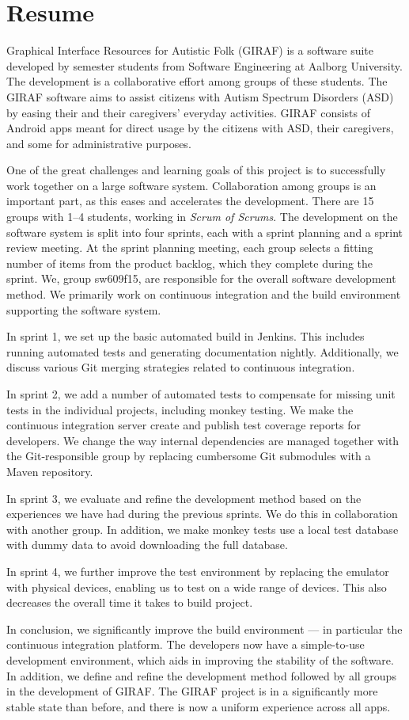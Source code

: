 \chapter*{Resume}
Graphical Interface Resources for Autistic Folk (GIRAF) is a software suite developed by  semester students from Software Engineering at Aalborg University. The development is a collaborative effort among groups of these students. The GIRAF software aims to assist citizens with Autism Spectrum Disorders (ASD) by easing their and their caregivers' everyday activities. GIRAF consists of Android apps meant for direct usage by the citizens with ASD, their caregivers, and some for administrative purposes.

One of the great challenges and learning goals of this project is to successfully work together on a large software system. Collaboration among groups is an important part, as this eases and accelerates the development. There are 15 groups with 1--4 students, working in \emph{Scrum of Scrums}. The development on the software system is split into four sprints, each with a sprint planning and a sprint review meeting. At the sprint planning meeting, each group selects a fitting number of items from the product backlog, which they complete during the sprint. We, group sw609f15, are responsible for the overall software development method. We primarily work on continuous integration and the build environment supporting the software system.

In sprint 1, we set up the basic automated build in Jenkins. This includes running automated tests and generating documentation nightly. Additionally, we discuss various Git merging strategies related to continuous integration.

In sprint 2, we add a number of automated tests to compensate for missing unit tests in the individual projects, including monkey testing. We make the continuous integration server create and publish test coverage reports for developers. We change the way internal dependencies are managed together with the Git-responsible group by replacing cumbersome Git submodules with a Maven repository.

In sprint 3, we evaluate and refine the development method based on the experiences we have had during the previous sprints. We do this in collaboration with another group. In addition, we make monkey tests use a local test database with dummy data to avoid downloading the full database.

In sprint 4, we further improve the test environment by replacing the emulator with physical devices, enabling us to test on a wide range of devices. This also decreases the overall time it takes to build project.

In conclusion, we significantly improve the build environment --- in particular the continuous integration platform. The developers now have a simple-to-use development environment, which aids in improving the stability of the software. In addition, we define and refine the development method followed by all groups in the development of GIRAF\@. The GIRAF project is in a significantly more stable state than before, and there is now a uniform experience across all apps.